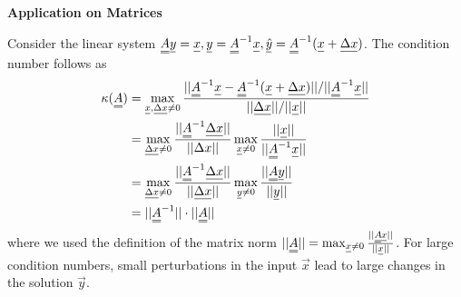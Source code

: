 \textbf{Application on Matrices}\par
Consider the linear system $\mat{A}\vec{y}=\vec{x}, \vec{y} = \mat{A}^{-1}\vec{x}, \vec{\hat{y}} = \mat{A}^{-1}(\vec{x} + \vec{\Delta x})$. The condition number follows as
\begin{equation}
    \begin{aligned}
        \kappa(\mat{A}) &= \max_{\vec{x},\vec{\Delta x} \ne 0} \frac{||\mat{A}^{-1}\vec{x}-\mat{A}^{-1}(\vec{x} + \vec{\Delta x})|| / ||\mat{A}^{-1}\vec{x}||}{||\vec{\Delta x}|| / ||\vec{x}||} \\
                        &= \max_{\vec{\Delta x} \ne 0} \frac{||\mat{A}^{-1}\vec{\Delta x}||}{||\Delta x||} \max_{\vec{x} \ne 0} \frac{||\vec{x}||}{||\mat{A}^{-1}\vec{x}||} \\
                        &= \max_{\vec{\Delta x} \ne 0} \frac{||\mat{A}^{-1}\vec{\Delta x}||}{||\vec{\Delta x}||} \max_{\vec{y} \ne 0} \frac{||\mat{A}\vec{y}||}{||\vec{y}||} \\
                        &= ||\mat{A}^{-1}|| \cdot ||\mat{A}||
    \end{aligned}
\end{equation}
where we used the definition of the matrix norm $||\mat{A}|| = \max_{\vec{x} \ne 0} \frac{||\mat{A}\vec{x}||}{||\vec{x}||}$. For large condition numbers, small perturbations in the input $\vec{x}$ lead to
large changes in the solution $\vec{y}$.
    
